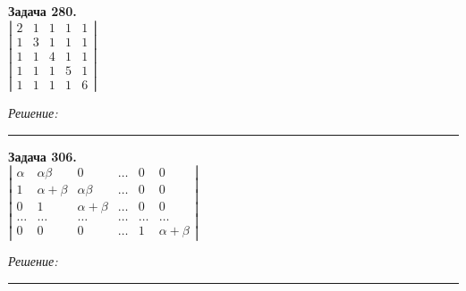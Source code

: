 \documentclass[a4paper, 12pt]{article}
\newenvironment{problem}[2][Задача]
    { \begin{mdframed}[backgroundcolor=gray!10] \textbf{#1 #2.} \\}
    {  \end{mdframed}}
\newenvironment{solution}
    {\textit{Решение: }}
    {\noindent\rule{7in}{1.5pt}}
\begin{document}
\begin{problem}{280}
$\left| \begin{array}{rrrrr}2 & 1 & 1 & 1 & 1 \\ 1 & 3 & 1 & 1 & 1 \\ 1 & 1 & 4 & 1 & 1 \\ 1 & 1 & 1 & 5 & 1 \\ 1 & 1 & 1 & 1 & 6 \end{array} \right|$
\end{problem}
\begin{solution}



\end{solution} 

\begin{problem}{306}
$\left| \begin{array}{cccccc}\alpha & \alpha\beta & 0 & \ldots & 0 & 0 \\ 1 & \alpha+\beta & \alpha\beta & \ldots & 0 &  0 \\ 0 & 1 & \alpha+\beta & \ldots & 0 & 0 \\ \ldots & \ldots & \ldots & \ldots & \ldots & \ldots \\ 0 & 0 & 0 & \ldots & 1 & \alpha+\beta \end{array} \right|$
\end{problem}
\begin{solution}



\end{solution} 


\end{document}
